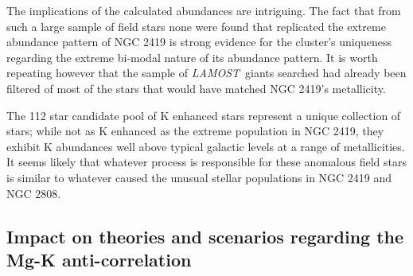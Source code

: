 \documentclass[a4paper,fleqn,usenatbib]{mnras}
\newcommand{\project}[1]{\emph{#1}}
\newcommand{\lamost}{\project{LAMOST}}
\begin{document}
The implications of the calculated abundances are intriguing. The fact that from such a large sample of field stars none were found that replicated the extreme abundance pattern of NGC 2419 is strong evidence for the cluster's uniqueness regarding the extreme bi-modal nature of its abundance pattern. It is worth repeating however that the sample of \lamost\ giants searched had already been filtered of most of the stars that would have matched NGC 2419's metallicity.

The 112 star candidate pool of K enhanced stars represent a unique collection of stars; while not as K enhanced as the extreme population in NGC 2419, they exhibit K abundances well above typical galactic levels at a range of metallicities. It seems likely that whatever process is responsible for these anomalous field stars is similar to whatever caused the unusual stellar populations in NGC 2419 and NGC 2808.

\subsection{Impact on theories and scenarios regarding the Mg-K anti-correlation}
\end{document}
